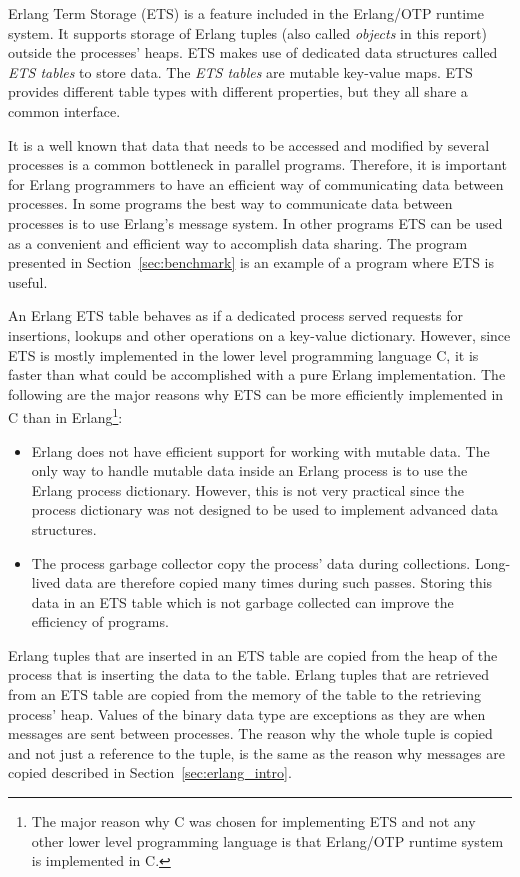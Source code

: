 \documentclass[aps,pre,preprint,nofootinbib]{revtex4}
\begin{document}
Erlang Term Storage (ETS) is a feature included in the Erlang/OTP runtime system.
It supports storage of Erlang tuples (also called \emph{objects} in this report) outside the processes' heaps.
ETS makes use of dedicated data structures called \emph{ETS tables} to store data.
The \emph{ETS tables} are mutable key-value maps.
ETS provides different table types with different properties, but they all share a common interface.

It is a well known that data that needs to be accessed and modified by several processes is a common bottleneck in parallel programs.
Therefore, it is important for Erlang programmers to have an efficient way of communicating data between processes.
In some programs the best way to communicate data between processes is to use Erlang's message system.
In other programs ETS can be used as a convenient and efficient way to accomplish data sharing. 
The program presented in Section~\ref{sec:benchmark} is an example of a program where ETS is useful.

An Erlang ETS table behaves as if a dedicated process served requests for insertions, lookups and other operations on a key-value dictionary.
However, since ETS is mostly implemented in the lower level programming language C, it is faster than what could be accomplished with a pure Erlang implementation.
The following are the major reasons why ETS can be more efficiently implemented in C than in Erlang\footnote{The major reason why C was chosen for implementing ETS and not any other lower level programming language is that Erlang/OTP runtime system is implemented in C.}:
\begin{itemize}
\item
Erlang does not have efficient support for working with mutable data.
The only way to handle mutable data inside an Erlang process is to use the Erlang process dictionary.
However, this is not very practical since the process dictionary was not designed to be used to implement advanced data structures.
\item 
The process garbage collector copy the process' data during collections.
Long-lived data are therefore copied many times during such passes. 
Storing this data in an ETS table which is not garbage collected can improve the efficiency of programs.
\end{itemize}

Erlang tuples that are inserted in an ETS table are copied from the heap of the process that is inserting the data to the table.
Erlang tuples that are retrieved from an ETS table are copied from the memory of the table to the retrieving process' heap.
Values of the binary data type are exceptions as they are when messages are sent between processes.
The reason why the whole tuple is copied and not just a reference to the tuple, is the same as the reason why messages are copied described in Section~\ref{sec:erlang_intro}.
\end{document}
